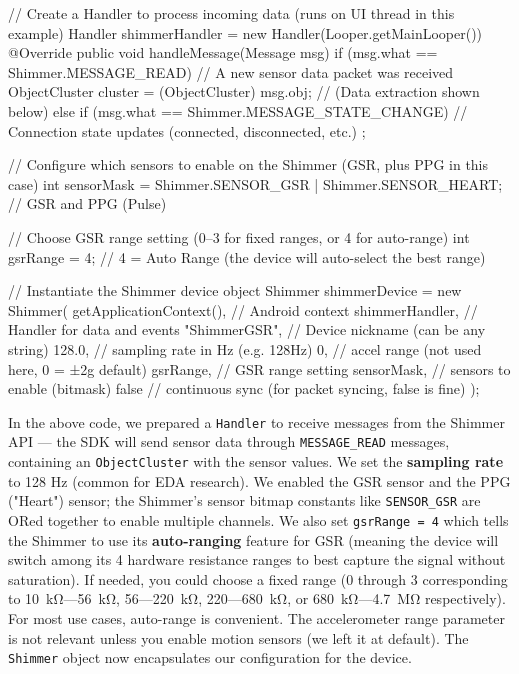     // Create a Handler to process incoming data (runs on UI thread in this example)
    Handler shimmerHandler = new Handler(Looper.getMainLooper()) {
        @Override
        public void handleMessage(Message msg) {
            if (msg.what == Shimmer.MESSAGE_READ) {
                // A new sensor data packet was received
                ObjectCluster cluster = (ObjectCluster) msg.obj;
                // (Data extraction shown below)
            } else if (msg.what == Shimmer.MESSAGE_STATE_CHANGE) {
                // Connection state updates (connected, disconnected, etc.)
            }
        }
    };

    // Configure which sensors to enable on the Shimmer (GSR, plus PPG in this case)
    int sensorMask = Shimmer.SENSOR_GSR | Shimmer.SENSOR_HEART;  // GSR and PPG (Pulse)

    // Choose GSR range setting (0–3 for fixed ranges, or 4 for auto-range)
    int gsrRange = 4;  // 4 = Auto Range (the device will auto-select the best range)

    // Instantiate the Shimmer device object
    Shimmer shimmerDevice = new Shimmer(
            getApplicationContext(),           // Android context
            shimmerHandler,                    // Handler for data and events
            "ShimmerGSR",                      // Device nickname (can be any string)
            128.0,                             // sampling rate in Hz (e.g. 128Hz)
            0,                                 // accel range (not used here, 0 = ±2g default)
            gsrRange,                          // GSR range setting
            sensorMask,                        // sensors to enable (bitmask)
            false                              // continuous sync (for packet syncing, false is fine)
    );

In the above code, we prepared a \texttt{Handler} to receive messages from the
Shimmer API --- the SDK will send sensor data through \texttt{MESSAGE_READ}
messages, containing an \texttt{ObjectCluster} with the sensor values. We set
the \textbf{sampling rate} to 128 Hz (common for EDA research). We enabled
the GSR sensor and the PPG ("Heart") sensor; the Shimmer's sensor bitmap
constants like \texttt{SENSOR_GSR} are ORed together to enable multiple
channels. We also set \texttt{gsrRange = 4} which tells the Shimmer to use its
\textbf{auto-ranging} feature for GSR (meaning the device will switch among
its 4 hardware resistance ranges to best capture the signal without
saturation). If needed, you could choose a fixed range (0 through 3
corresponding to 10 kΩ---56 kΩ, 56---220 kΩ, 220---680 kΩ, or
680 kΩ---4.7 MΩ
respectively\cite{GSRPPGMachineLearning2024}).
For most use cases, auto-range is convenient. The accelerometer range
parameter is not relevant unless you enable motion sensors (we left it
at default). The \texttt{Shimmer} object now encapsulates our configuration for
the device.

